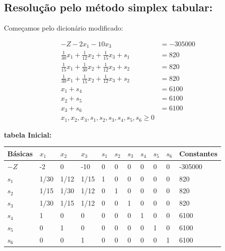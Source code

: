 \documentclass[12pt, a4paper]{article}
\begin{document}
\subsection[Método simplex tabular]{Resolução pelo método simplex tabular:}

Começamos pelo dicionário modificado:

\begin{align*}
  -Z -2x_1 - 10x_3 &= -305000 \\
  \frac{1}{30}x_1 + \frac{1}{12}x_2 + \frac{1}{15}x_3 + s_1 &= 820 \\
  \frac{1}{15}x_1 + \frac{1}{30}x_2 + \frac{1}{12}x_3 + s_2 &= 820 \\
  \frac{1}{30}x_1 + \frac{1}{15}x_2 + \frac{1}{12}x_3 + s_2 &= 820 \\
  x_1 + s_4 &= 6100 \\
  x_2 + s_5 &= 6100 \\
  x_3 + s_6 &= 6100 \\
  x_1, x_2, x_3, s_1, s_2, s_3, s_4, s_5, s_6 \geq 0
\end{align*}

\textbf{tabela Inicial:}
\begin{center}
\begin{tabular}{lllllllllll}
\toprule
Básicas & $x_1$ & $x_2$ & $x_3$ & $s_1$ & $s_2$ & $s_3$ & $s_4$ & $s_5$ & $s_6$ & Constantes \\
\midrule
$-Z$ & -2 & 0 & -10 & 0 & 0 & 0 & 0 & 0 & 0 & -305000 \\
$s_1$ & 1/30 & 1/12 & 1/15 & 1 & 0 & 0 & 0 & 0 & 0 & 820 \\
$s_2$ & 1/15 & 1/30 & 1/12 & 0 & 1 & 0 & 0 & 0 & 0 & 820 \\
$s_3$ & 1/30 & 1/15 & 1/12 & 0 & 0 & 1 & 0 & 0 & 0 & 820 \\
$s_4$ & 1 & 0 & 0 & 0 & 0 & 0 & 1 & 0 & 0 & 6100 \\
$s_5$ & 0 & 1 & 0 & 0 & 0 & 0 & 0 & 1 & 0 & 6100 \\
$s_6$ & 0 & 0 & 1 & 0 & 0 & 0 & 0 & 0 & 1 & 6100 \\
\bottomrule
\end{tabular}
\end{center}
\end{document}
